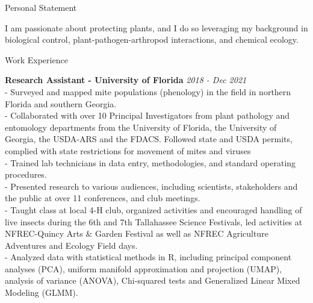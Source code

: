 \documentclass{resume} %
\begin{document}
\begin{rSection}{Personal Statement}
	
I am passionate about protecting plants, and I do so leveraging my background in biological control, plant-pathogen-arthropod interactions, and chemical ecology. \end{rSection}

\begin{rSection}{Work Experience}
	
	\textbf{Research Assistant - University of Florida} \hfill {\em \textit{2018 - Dec 2021}}\\
- Surveyed and mapped mite populations (phenology) in the field in northern Florida and southern Georgia.\\
- Collaborated with over 10 Principal Investigators from plant pathology and entomology departments from the University of Florida, the University of Georgia, the USDA-ARS and the FDACS. Followed state and USDA permits, complied with state restrictions for movement of mites and viruses\\
 - Trained lab technicians in data entry, methodologies, and standard operating procedures.\\
 - Presented research to various audiences, including scientists, stakeholders and the public at over 11 conferences, and club meetings.\\
 - Taught class at local 4-H club, organized activities and encouraged handling of live insects during the 6th and 7th Tallahassee Science Festivals, led activities at NFREC-Quincy Arts \& Garden Festival as well as NFREC Agriculture Adventures and Ecology Field days.\\
 -  Analyzed data with statistical methods in R, including principal component analyses (PCA), uniform manifold approximation and projection (UMAP), analysis of variance (ANOVA), Chi-squared tests and Generalized Linear Mixed Modeling (GLMM). \\


\end{rSection}
\end{document}
